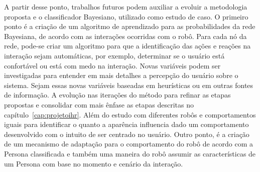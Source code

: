 A partir desse ponto, trabalhos futuros podem auxiliar a evoluir a metodologia proposta e o classificador Bayesiano, utilizado como estudo de caso. O primeiro ponto é a criação de um algoritmo de aprendizado para as probabilidades da rede Bayesiana, de acordo com as interações ocorridas com o robô. Para cada nó da rede, pode-se criar um algoritmo para que a identificação das ações e reações na interação sejam automáticas, por exemplo, determinar se o usuário está confortável ou está com medo na interação. Novas variáveis podem ser investigadas para entender em mais detalhes a percepção do usuário sobre o sistema. Sejam essas novas variáveis baseadas em heurísticas ou em outras fontes de informação. A evolução nas iterações do método para refinar as etapas propostas e consolidar com mais ênfase as etapas descritas no capítulo~\ref{cap:projetoihr}. Além do estudo com diferentes robôs e comportamentos iguais para identificar o quanto a aparência influencia dado um comportamento desenvolvido com o intuito de ser centrado no usuário. Outro ponto, é a criação de um mecanismo de adaptação para o comportamento do robô de acordo com a Persona classificada e também uma maneira do robô assumir as características de um Persona com base no momento e cenário da interação.